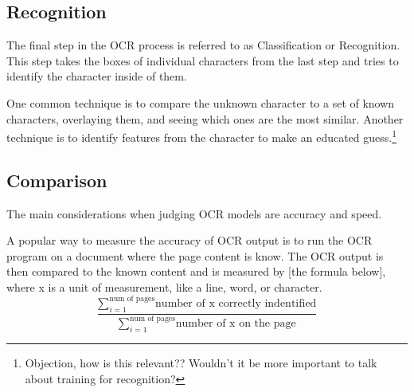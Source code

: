 \documentclass[sigplan,screen,nonacm]{acmart-tagged}
\begin{document}
\subsection{Recognition}
\label{Recognition}

The final step in the OCR process is referred to as Classification or Recognition. This step takes the boxes of individual characters from the last step and tries to identify the character inside of them.

One common technique is to compare the unknown character to a set of known characters, overlaying them, and seeing which ones are the most similar. Another technique is to identify features from the character to make an educated guess.\citep{Thorat:2022}\footnote{Objection, how is this relevant?? Wouldn't it be more important to talk about training for recognition?}

%

\subsection{Comparison}
\label{comparison}

The main considerations when judging OCR models are accuracy and speed.\cite{Avyodri:2022} 


A popular way to measure the accuracy of OCR output is to run the OCR program on a document where the page content is know. The OCR output is then compared to the known content and is measured by [the formula below], where x is a unit of measurement, like a line, word, or character.
\[
\dfrac{\sum\limits_{i=1}^\text{num of pages}\text{number of x correctly indentified}}{\sum\limits_{i=1}^\text{num of pages}\text{number of x on the page}}
\]
\end{document}
